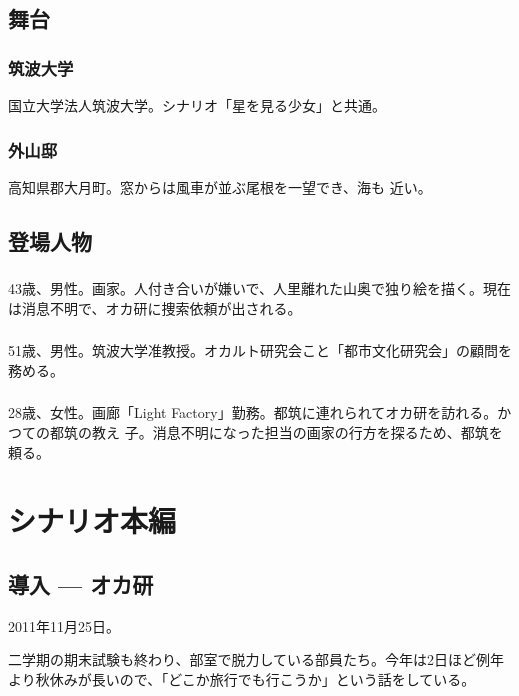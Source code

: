 \documentclass[a4paper,8pt,min]{jsarticle}
\begin{document}
\subsection{舞台}
\subsubsection{筑波大学}
国立大学法人筑波大学。シナリオ「星を見る少女」と共通。

\subsubsection{外山邸}
高知県郡大月町。窓からは風車が並ぶ尾根を一望でき、海も
近い。
\subsection{登場人物}
\subsubsection{}
43歳、男性。画家。人付き合いが嫌いで、人里離れた山奥で独り絵を描く。現在
は消息不明で、オカ研に捜索依頼が出される。

\subsubsection{} 
51歳、男性。筑波大学准教授。オカルト研究会こと「都市文化研究会」の顧問を務める。

\subsubsection{}
28歳、女性。画廊「Light Factory」勤務。都筑に連れられてオカ研を訪れる。かつての都筑の教え
子。消息不明になった担当の画家の行方を探るため、都筑を頼る。

\newpage
\section{シナリオ本編}
\subsection{導入 --- オカ研}
2011年11月25日。


二学期の期末試験も終わり、部室で脱力している部員たち。今年は2日ほど例年
より秋休みが長いので、「どこか旅行でも行こうか」という話をしている。\\
\end{document}
